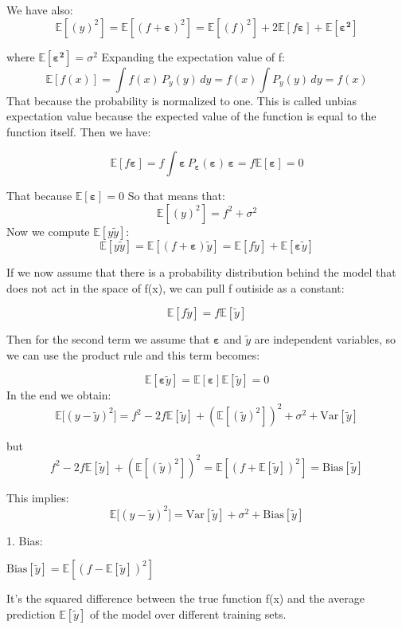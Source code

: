 \documentclass[%
 reprint,            %
 amsmath,amssymb,
 aps,
]{revtex4-2}
\begin{document}
We have also:
$$\mathbb{E}[(y)^2] = \mathbb{E}[(f+\boldsymbol{\varepsilon})^2]=\mathbb{E}[(f)^2] + 2\mathbb{E}[f\boldsymbol{\varepsilon}] + \mathbb{E}[\boldsymbol{\varepsilon^2}]
$$

where $ \mathbb{E}[\boldsymbol{\varepsilon^2}]=\sigma^2$
Expanding the expectation value of f: 
$$\mathbb{E}[f(x)]= \int f(x) \, P_y(y) \, dy 
= f(x) \int P_y(y) \, dy 
= f(x)
$$
That because the probability is normalized to one.
This is called unbias expectation value because the expected value of the function is equal to the function itself.
Then we have:

$$\mathbb{E}[f\boldsymbol{\varepsilon}]= f \int \boldsymbol{\varepsilon} \, P_{\boldsymbol{\varepsilon}}(\boldsymbol{\varepsilon}) \, \boldsymbol{\varepsilon}
= f \mathbb{E}[\boldsymbol{\varepsilon}]=0 $$ 

That because $\mathbb{E}[\boldsymbol{\varepsilon}] = 0$
So that means that:
$$\mathbb{E}[(y)^2] = f^2 + \sigma^2$$
Now we compute $\mathbb{E}[y \tilde y]$:
$$
\mathbb{E}[y \tilde y]=\mathbb{E}[(f+\boldsymbol{\varepsilon}) \tilde y]  
= \mathbb{E}[f \tilde y]+\mathbb{E}[\boldsymbol{\varepsilon} \tilde y]$$

If we now assume that there is a probability distribution behind the model that does not act in the space of f(x), we can pull f outiside as a constant:

$$\mathbb{E}[f \tilde y]= f \mathbb{E}[\tilde y]$$

Then for the second term we assume that $\boldsymbol{\varepsilon}$ and $\tilde y$ are independent variables, so we can use the product rule and this term becomes: 

$$ \mathbb{E}[\boldsymbol{\varepsilon} \tilde y] =\mathbb{E}[\boldsymbol{\varepsilon}]\mathbb{E}[\tilde y] = 0 $$
In the end we obtain: 
$$
\mathbb{E}[(y - \tilde y)^2\big] = f^2 -2f\mathbb{E}[\tilde y]+(\mathbb{E}[(\tilde y)^2])^2 +\sigma^2+\mathrm{Var}[\tilde y]$$

but $$f^2 -2f\mathbb{E}[\tilde y]+(\mathbb{E}[(\tilde y)^2])^2 = \mathbb{E}[(f+\mathbb{E}[\tilde y])^2] = \mathrm{Bias}[\tilde y] $$

This implies: $$\mathbb{E}[(y - \tilde y)^2\big] =\mathrm{Var}[\tilde y]+\sigma^2+\mathrm{Bias}[\tilde y]$$

 1. Bias:
 
  $\mathrm{Bias}[\tilde y]= \mathbb{E}[(f-\mathbb{E}[\tilde y])^2]$

It's the squared difference between the true function f(x) and the average prediction $\mathbb{E}[\tilde y]$ of the model over different training sets.  
\end{document}
